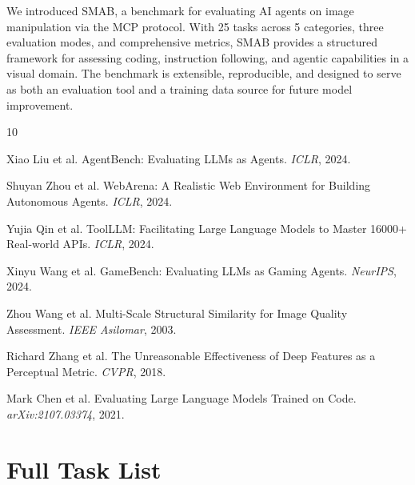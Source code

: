 \documentclass[11pt,a4paper]{article}
\begin{document}
We introduced SMAB, a benchmark for evaluating AI agents on image manipulation via the MCP protocol. With 25 tasks across 5 categories, three evaluation modes, and comprehensive metrics, SMAB provides a structured framework for assessing coding, instruction following, and agentic capabilities in a visual domain. The benchmark is extensible, reproducible, and designed to serve as both an evaluation tool and a training data source for future model improvement.


\begin{thebibliography}{10}

Xiao Liu et al.
\newblock AgentBench: Evaluating LLMs as Agents.
\newblock \emph{ICLR}, 2024.

Shuyan Zhou et al.
\newblock WebArena: A Realistic Web Environment for Building Autonomous Agents.
\newblock \emph{ICLR}, 2024.

Yujia Qin et al.
\newblock ToolLLM: Facilitating Large Language Models to Master 16000+ Real-world APIs.
\newblock \emph{ICLR}, 2024.

Xinyu Wang et al.
\newblock GameBench: Evaluating LLMs as Gaming Agents.
\newblock \emph{NeurIPS}, 2024.

Zhou Wang et al.
\newblock Multi-Scale Structural Similarity for Image Quality Assessment.
\newblock \emph{IEEE Asilomar}, 2003.

Richard Zhang et al.
\newblock The Unreasonable Effectiveness of Deep Features as a Perceptual Metric.
\newblock \emph{CVPR}, 2018.

Mark Chen et al.
\newblock Evaluating Large Language Models Trained on Code.
\newblock \emph{arXiv:2107.03374}, 2021.

\end{thebibliography}

\appendix

\section{Full Task List}
\end{document}
